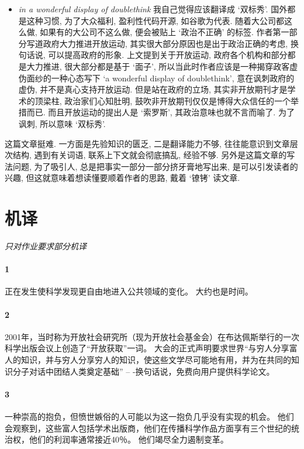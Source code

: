 \documentclass[a4paper, 12pt, UTF8]{article}
\begin{document}
\begin{itemize}
    \item \emph{in a wonderful display of doublethink} 我自己觉得应该翻译成 `双标秀'.  国外都是这种习惯, 为了大众福利, 盈利性代码开源, 如谷歌为代表. 随着大公司都这么做, 如果有的大公司不这么做, 便会被贴上 `政治不正确' 的标签. 作者第一部分写道政府大力推进开放运动, 其实很大部分原因也是出于政治正确的考虑, 换句话说, 可以提高政府的形象. 上文提到关于开放运动, 政府各个机构和部分都是大力推进, 很大部分都是基于 `面子', 所以当此时作者应该是一种揭穿政客虚伪面纱的一种心态写下 `a wonderful display of doublethink', 意在讽刺政府的虚伪, 并不是真心支持开放运动. 但是站在政府的立场, 其实非开放期刊才是学术的顶梁柱, 政治家们心知肚明, 鼓吹非开放期刊仅仅是博得大众信任的一个举措而已. 而且开放运动的提出人是 `索罗斯', 其政治意味也就不言而喻了. 为了讽刺, 所以意味 `双标秀'.
\end{itemize}

这篇文章挺难. 一方面是先验知识的匮乏, 二是翻译能力不够, 往往能意识到文章层次结构, 遇到有关词语, 联系上下文就会彻底搞乱, 经验不够. 另外是这篇文章的写法问题, 为了吸引人, 总是把事实一部分一部分挤牙膏地写出来, 是可以引发读者的兴趣, 但这就意味着想读懂要顺着作者的思路, 戴着 `镣铐' 读文章.

\section{机译}
\emph{只对作业要求部分机译}


\paragraph{1} 正在发生使科学发现更自由地进入公共领域的变化。 大约也是时间。

\paragraph{2}2001年，当时称为开放社会研究所（现为开放社会基金会）在布达佩斯举行的一次科学出版会议上创造了“开放获取”一词。 大会的正式声明要求世界“与穷人分享富人的知识，并与穷人分享穷人的知识，使这些文学尽可能地有用，并为在共同的知识分子对话中团结人类奠定基础” – -换句话说，免费向用户提供科学论文。

\paragraph{3}一种崇高的抱负，但愤世嫉俗的人可能以为这一抱负几乎没有实现的机会。 他们会观察到，这些富人包括学术出版商，他们在传播科学作品方面享有三个世纪的统治权，他们的利润率通常接近40％。 他们竭尽全力遏制变革。
\end{document}
